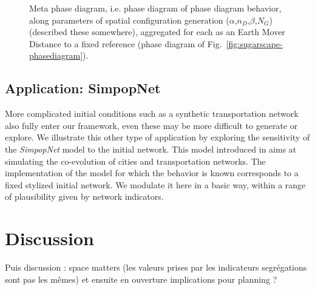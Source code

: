 \documentclass[a4paper,12pt]{article}
\begin{document}
\begin{figure}
\centering
%
\caption{Meta phase diagram, i.e. phase diagram of phase diagram behavior, along parameters of spatial configuration generation ($\alpha$,$n_D$,$\beta$,$N_G$) (described these somewhere), aggregated for each as an Earth Mover Distance to a fixed reference (phase diagram of Fig.~\ref{fig:sugarscape-phasediagram}).}
\label{fig:sugarscape-meta}
\end{figure}


\subsection{Application: SimpopNet}

More complicated initial conditions such as a synthetic transportation network also fully enter our framework, even these may be more difficult to generate or explore. We illustrate this other type of application by exploring the sensitivity of the \emph{SimpopNet} model to the initial network. This model introduced in \cite{schmitt2014modelisation} aims at simulating the co-evolution of cities and transportation networks. The implementation of the model for which the behavior is known corresponds to a fixed stylized initial network. We modulate it here in a basic way, within a range of plausibility given by network indicators.








\section{Discussion}

Puis discussion : space matters (les valeurs prises par les indicateurs segrégations sont pas les mêmes) et ensuite en ouverture implications pour planning ?








\end{document}
